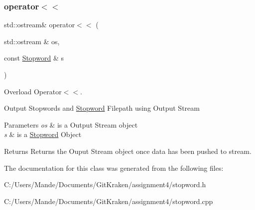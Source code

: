\subsubsection{\texorpdfstring{operator$<$$<$}{operator<<}}
{\footnotesize\ttfamily std\+::ostream\& operator$<$$<$ (\begin{DoxyParamCaption}\item[{std\+::ostream \&}]{os,  }\item[{const \hyperlink{class_stopword}{Stopword} \&}]{s }\end{DoxyParamCaption})\hspace{0.3cm}{\ttfamily [friend]}}



Overload Operator$<$$<$. 

Output Stopwords and \hyperlink{class_stopword}{Stopword} Filepath using Output Stream


\begin{DoxyParams}{Parameters}
{\em os} & is a Output Stream object \\
\hline
{\em s} & is a \hyperlink{class_stopword}{Stopword} Object \\
\hline
\end{DoxyParams}
\begin{DoxyReturn}{Returns}
Returns the Ouput Stream object once data has been pushed to stream. 
\end{DoxyReturn}


The documentation for this class was generated from the following files\+:\begin{DoxyCompactItemize}
\item 
C\+:/\+Users/\+Mande/\+Documents/\+Git\+Kraken/assignment4/stopword.\+h\item 
C\+:/\+Users/\+Mande/\+Documents/\+Git\+Kraken/assignment4/stopword.\+cpp\end{DoxyCompactItemize}
